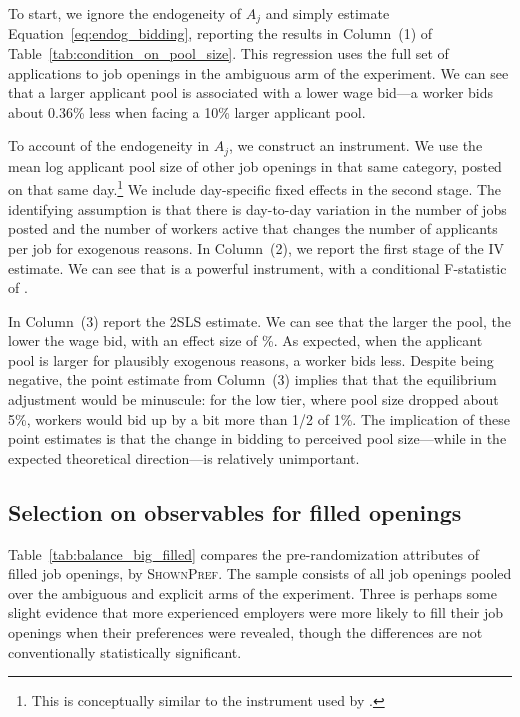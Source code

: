 \documentclass[12pt]{article}
\begin{document}
To start, we ignore the endogeneity of $A_j$ and simply estimate Equation~\ref{eq:endog_bidding}, reporting the results in Column~(1) of Table~\ref{tab:condition_on_pool_size}.
This regression uses the full set of applications to job openings in the ambiguous arm of the experiment.
We can see that a larger applicant pool is associated with a lower wage bid---a worker bids about 0.36\% less when facing a 10\% larger applicant pool. 



To account of the endogeneity in $A_j$, we construct an instrument. 
We use the mean log applicant pool size of other job openings in that same category, posted on that same day.\footnote{
  This is conceptually similar to the instrument used by \cite{camerer1997labor}. 
}
We include day-specific fixed effects in the second stage.
The identifying assumption is that there is day-to-day variation in the number of jobs posted and the number of workers active that changes the number of applicants per job for exogenous reasons.
In Column~(2), we report the first stage of the IV estimate.
We can see that is a powerful instrument, with a conditional F-statistic of \IVcondFstat{}. 

In Column~(3) report the 2SLS estimate.
We can see that the larger the pool, the lower the wage bid, with an effect size of \PoolSizeIV{}\%. 
As expected, when the applicant pool is larger for plausibly exogenous reasons, a worker bids less.
Despite being negative, the point estimate from Column~(3) implies that that the equilibrium adjustment would be minuscule: 
 for the low tier, where pool size dropped about 5\%, workers would bid up by a bit more than 1/2 of 1\%. 
The implication of these point estimates is that the change in bidding to perceived pool size---while in the expected theoretical direction---is relatively unimportant.

\subsection{Selection on observables for filled openings} \label{sec:soo}

Table~\ref{tab:balance_big_filled} compares the pre-randomization attributes of filled job openings, by \textsc{ShownPref}.
The sample consists of all job openings pooled over the ambiguous and explicit arms of the experiment.
Three is perhaps some slight evidence that more experienced employers were more likely to fill their job openings when their preferences were revealed, though the differences are not conventionally statistically significant.
\end{document}
